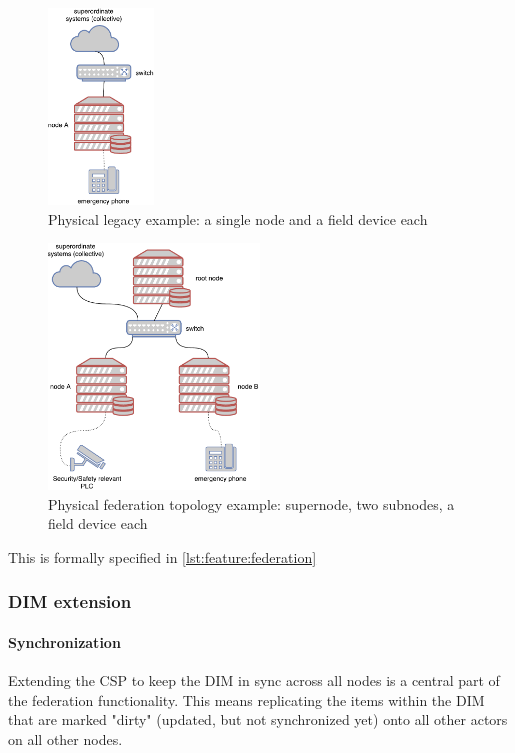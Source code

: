 \begin{figure}[]
	\center
	\includegraphics[width=0.25\textwidth]{img/topo_sl_noha.pdf}
	\caption{Physical legacy example: a single node and a field device each}
	\label{fig:topo:sl:noha}
\end{figure}
\begin{figure}[]
	\center
	\includegraphics[width=0.5\textwidth]{img/topo_ml_noha.pdf}
	\caption{Physical federation topology example: supernode, two subnodes, a field device each}
	\label{fig:topo:ml:noha}
\end{figure}

This is formally specified in \autoref{lst:feature:federation}


\subsubsection{DIM extension}

\paragraph{Synchronization}
Extending the \gls{CSP} to keep the \gls{DIM} in sync across all nodes is a central
part of the federation functionality. This means replicating the
items within the DIM that are marked "dirty" (updated, but not synchronized yet) onto all other actors on all other nodes.

